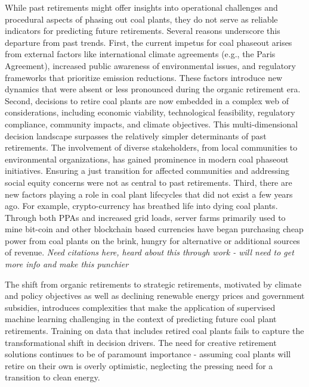 While past retirements might offer insights into operational challenges and procedural aspects of phasing out 
coal plants, they do not serve as reliable indicators for predicting future retirements. Several reasons underscore 
this departure from past trends. First, the current impetus for coal phaseout arises from external factors like 
international climate agreements (e.g., the Paris Agreement), increased public awareness of environmental issues, 
and regulatory frameworks that prioritize emission reductions. These factors introduce new dynamics that were 
absent or less pronounced during the organic retirement era. Second, decisions to retire coal plants are now embedded 
in a complex web of considerations, including economic viability, technological feasibility, regulatory compliance, 
community impacts, and climate objectives. This multi-dimensional decision landscape surpasses the relatively simpler 
determinants of past retirements. The involvement of diverse stakeholders, from local communities to environmental 
organizations, has gained prominence in modern coal phaseout initiatives. Ensuring a just transition for affected 
communities and addressing social equity concerns were not as central to past retirements. Third, there are new factors playing
a role in coal plant lifecycles that did not exist a few years ago. For example, crypto-currency has breathed life into dying coal plants. 
Through both PPAs and increased grid loads, server farms primarily used to 
mine bit-coin and other blockchain based currencies have began purchasing cheap power from coal plants on the brink, hungry 
for alternative or additional sources of revenue. \textit{Need citations here, heard about this through work - will need 
to get more info and make this punchier}

The shift from organic retirements to strategic retirements, motivated by climate and policy objectives as well as declining renewable
energy prices and government subsidies, introduces complexities 
that make the application of supervised machine learning challenging in the context of predicting future coal plant retirements. 
Training on data that includes retired coal plants fails to capture the transformational shift in decision drivers. The need for 
creative retirement solutions continues to be of paramount importance - assuming coal plants will retire on their own is overly 
optimistic, neglecting the pressing need for a transition to clean energy.